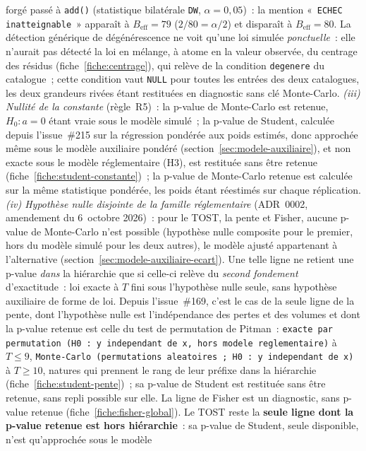 \documentclass[a4paper,11pt]{article}
\newcommand{\code}[1]{\texttt{\small #1}}
\begin{document}
forgé passé à \code{add()} (statistique bilatérale \code{DW}, $\alpha = 0{,}05$)~: la mention
«~\code{ECHEC inatteignable}~» apparaît à $B_{\text{eff}} = 79$ ($2/80 = \alpha/2$) et disparaît à
$B_{\text{eff}} = 80$. La détection
générique de dégénérescence ne voit qu'une loi simulée \emph{ponctuelle}~: elle n'aurait pas
détecté la loi en mélange, à atome en la valeur observée, du centrage des résidus
(fiche~\ref{fiche:centrage}), qui relève de la condition \code{degenere} du catalogue~; cette
condition vaut \code{NULL} pour toutes les entrées des deux catalogues, les deux grandeurs rivées
étant restituées en diagnostic sans clé Monte-Carlo. \emph{(iii) Nullité de la constante}
(règle~R5)~: la p-value de Monte-Carlo est retenue, $H_0 : a = 0$ étant vraie sous le modèle
simulé~; la p-value de Student, calculée depuis l'issue~\#215 sur la régression pondérée aux poids
estimés, donc approchée même sous le modèle auxiliaire pondéré (section~\ref{sec:modele-auxiliaire}),
et non exacte sous le modèle réglementaire (H3), est restituée sans être retenue
(fiche~\ref{fiche:student-constante})~; la p-value de Monte-Carlo retenue est calculée sur la même
statistique pondérée, les poids étant réestimés sur chaque réplication.
\emph{(iv) Hypothèse nulle disjointe de la famille réglementaire} (ADR~0002, amendement du
6~octobre 2026)~: pour le TOST, la pente et Fisher, aucune p-value de Monte-Carlo n'est possible
(hypothèse nulle composite pour le premier, hors du modèle simulé pour les deux autres), le
modèle ajusté appartenant à l'alternative (section~\ref{sec:modele-auxiliaire-ecart}). Une telle
ligne ne retient une p-value \emph{dans} la hiérarchie que si celle-ci relève du \emph{second
fondement} d'exactitude~: loi exacte à $T$ fini sous l'hypothèse nulle seule, sans hypothèse
auxiliaire de forme de loi. Depuis l'issue~\#169, c'est le cas de la seule ligne de la pente,
dont l'hypothèse nulle est l'indépendance des pertes et des volumes et dont la p-value retenue est
celle du test de permutation de Pitman~: \code{exacte par permutation (H0 : y independant de x,
hors modele reglementaire)} à $T \le 9$, \code{Monte-Carlo (permutations aleatoires ; H0 : y
independant de x)} à $T \ge 10$, natures qui prennent le rang de leur préfixe dans la hiérarchie
(fiche~\ref{fiche:student-pente})~; sa p-value de Student est restituée sans être retenue, sans
repli possible sur elle. La ligne de Fisher est un diagnostic, sans p-value retenue
(fiche~\ref{fiche:fisher-global}). Le TOST reste la \textbf{seule ligne dont la p-value retenue
est hors hiérarchie}~: sa p-value de Student, seule disponible, n'est qu'approchée sous le modèle
\end{document}
